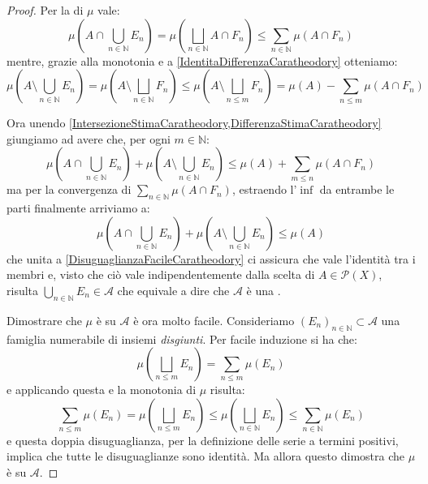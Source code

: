 \begin{proof}
	Per la \sigsubadd[ità] di $\mu$ vale:
	\begin{equation}\label{IntersezioneStimaCaratheodory}
		\mu\left(A\cap\bigcup_{n\in\mathbb N} E_n\right)=\mu\left(\bigsqcup_{n\in\mathbb N} A\cap F_n\right)\le
		\sum_{n\in\mathbb N} \mu(A\cap F_n)
	\end{equation}
	mentre, grazie alla monotonia e a \cref{IdentitaDifferenzaCaratheodory} otteniamo:
	\begin{equation}\label{DifferenzaStimaCaratheodory}
		\mu\left(A\setminus\bigcup_{n\in\mathbb N} E_n\right) = \mu\left(A\setminus\bigsqcup_{n\in\mathbb N} F_n\right) \le \mu\left(A\setminus\bigsqcup_{n\le m} F_n\right) = 
		\mu(A)-\sum_{n\le m}\mu(A\cap F_n)
	\end{equation}
	
	Ora unendo \cref{IntersezioneStimaCaratheodory,DifferenzaStimaCaratheodory} giungiamo ad avere che, per ogni $m\in\mathbb{N}$:
	\begin{equation*}
		\mu\left(A\cap\bigcup_{n\in\mathbb N} E_n\right)+\mu\left(A\setminus\bigcup_{n\in\mathbb N} E_n\right)\le
		\mu(A)+\sum_{m\le n}\mu(A\cap F_n) 
	\end{equation*}
	ma per la convergenza di $\sum_{n\in \mathbb N}\mu(A\cap F_n)$, estraendo l'$\inf$ da entrambe le parti finalmente arriviamo a:
	\begin{equation*}
		\mu\left(A\cap\bigcup_{n\in\mathbb N} E_n\right)+\mu\left(A\setminus\bigcup_{n\in\mathbb N} E_n\right)\le
		\mu(A)
	\end{equation*}
	che unita a \cref{DisuguaglianzaFacileCaratheodory} ci assicura che vale l'identità tra i membri e, visto che ciò vale indipendentemente dalla scelta di $A\in\mathcal P(X)$, risulta $\bigcup_{n\in\mathbb N}E_n\in\mathcal A$ che equivale a dire che $\mathcal A$ è una \sigalg{}.
	
	Dimostrare che $\mu$ è \sigadd{} su $\mathcal A$ è ora molto facile.
	Consideriamo $(E_n)_{n\in\mathbb N}\subset \mathcal A$ una famiglia numerabile di insiemi \emph{disgiunti}. Per facile induzione si ha che:
	\begin{equation*}
		\mu\left(\bigsqcup_{n\le m}E_n\right)=\sum_{n\le m} \mu(E_n)
	\end{equation*}
	e applicando questa e la monotonia di $\mu$ risulta:
	\begin{equation*}
		\sum_{n\le m} \mu(E_n)=\mu\left(\bigsqcup_{n\le m}E_n\right)\le
		\mu\left(\bigsqcup_{n\in\mathbb N}E_n\right)\le \sum_{n\in\mathbb N} \mu(E_n)
	\end{equation*}
	e questa doppia disuguaglianza, per la definizione delle serie a termini positivi, implica che tutte le disuguaglianze sono identità. Ma allora questo dimostra che $\mu$ è \sigadd{} su $\mathcal A$.
\end{proof}

